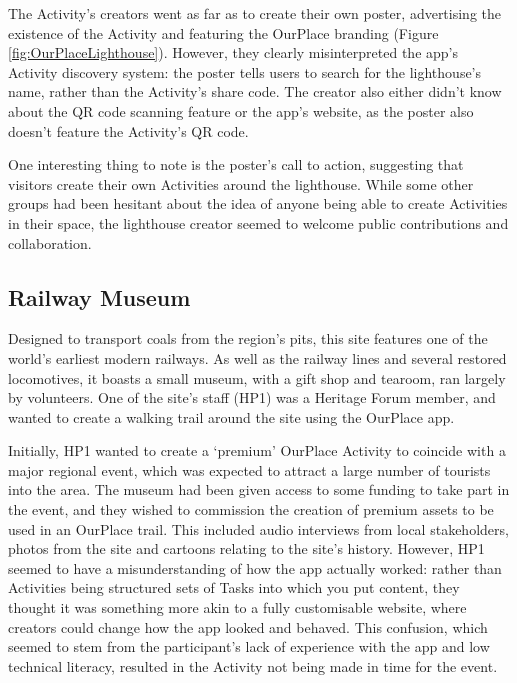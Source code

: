 The Activity's creators went as far as to create their own poster, advertising the existence of the Activity and featuring the OurPlace branding (Figure \ref{fig:OurPlaceLighthouse}). However, they clearly misinterpreted the app's Activity discovery system: the poster tells users to search for the lighthouse's name, rather than the Activity's share code. The creator also either didn't know about the QR code scanning feature or the app's website, as the poster also doesn't feature the Activity's QR code. 

One interesting thing to note is the poster's call to action, suggesting that visitors create their own Activities around the lighthouse. While some other groups had been hesitant about the idea of anyone being able to create Activities in their space, the lighthouse creator seemed to welcome public contributions and collaboration.

\subsection{Railway Museum}

Designed to transport coals from the region's pits, this site features one of the world's earliest modern railways. As well as the railway lines and several restored locomotives, it boasts a small museum, with a gift shop and tearoom, ran largely by volunteers. One of the site's staff (HP1) was a Heritage Forum member, and wanted to create a walking trail around the site using the OurPlace app.

Initially, HP1 wanted to create a `premium' OurPlace Activity to coincide with a major regional event, which was expected to attract a large number of tourists into the area. The museum had been given access to some funding to take part in the event, and they wished to commission the creation of premium assets to be used in an OurPlace trail. This included audio interviews from local stakeholders, photos from the site and cartoons relating to the site's history. However, HP1 seemed to have a misunderstanding of how the app actually worked: rather than Activities being structured sets of Tasks into which you put content, they thought it was something more akin to a fully customisable website, where creators could change how the app looked and behaved. This confusion, which seemed to stem from the participant's lack of experience with the app and low technical literacy, resulted in the Activity not being made in time for the event.

